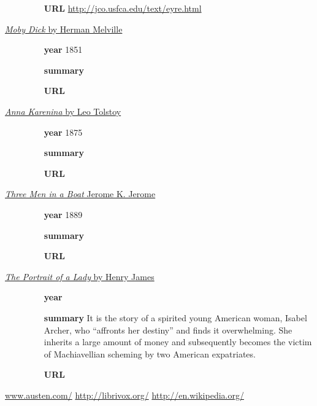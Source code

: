 \documentclass[a4paper,11pt,oneside]{book}
\begin{document}
\begin{description}
\begin{itemize}
	\item [{\bf URL}] \url{http://jco.usfca.edu/text/eyre.html}
	\end{itemize}
\item [\underline{{\it Moby Dick} by Herman Melville}]  
	\begin{itemize}
	\item [{\bf year}] 1851
	\item [{\bf summary}]
	\item [{\bf URL}] \url{}
	\end{itemize}
\item [\underline{{\it Anna Karenina} by Leo Tolstoy}] 
	\begin{itemize}
	\item [{\bf year}] 1875
	\item [{\bf summary}]
	\item [{\bf URL}] \url{}
	\end{itemize}
\item [\underline{{\it Three Men in a Boat} Jerome K. Jerome}] 
	\begin{itemize}
	\item [{\bf year}] 1889
	\item [{\bf summary}]
	\item [{\bf URL}] \url{}
	\end{itemize}
\item [\underline{{\it The Portrait of a Lady} by Henry James}] 
	\begin{itemize}
	\item [{\bf year}]
	\item [{\bf summary}] It is the story of a spirited young American woman, Isabel Archer, who “affronts her destiny” and finds it overwhelming. She inherits a large amount of money and subsequently becomes the victim of Machiavellian scheming by two American expatriates. 
	\item [{\bf URL}]
	\end{itemize}
\end{description}


\pagebreak
\begin{thebibliography}{XXX}
	 \url{www.austen.com/}
	 \url{http://librivox.org/}
	 \url{http://en.wikipedia.org/}
	 \url{}
	 \url{}
	 \url{}
	 \url{}
	 \url{}
	 \url{}
\end{thebibliography}
\end{document}
